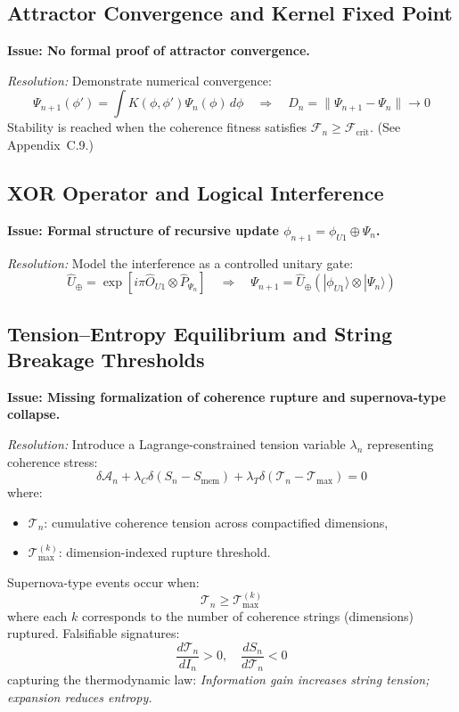\subsection*{Attractor Convergence and Kernel Fixed Point}

\textbf{Issue: No formal proof of attractor convergence.}

\textit{Resolution:}  
Demonstrate numerical convergence:
\[
\Psi_{n+1}(\phi') = \int K(\phi, \phi') \Psi_n(\phi) \, d\phi
\quad \Rightarrow \quad
D_n = \|\Psi_{n+1} - \Psi_n\| \to 0
\]
Stability is reached when the coherence fitness satisfies \( \mathcal{F}_n \geq \mathcal{F}_{\text{crit}} \). (See Appendix~C.9.)

\subsection*{XOR Operator and Logical Interference}

\textbf{Issue: Formal structure of recursive update \( \phi_{n+1} = \phi_{U1} \oplus \Psi_n \).}

\textit{Resolution:}  
Model the interference as a controlled unitary gate:
\[
\hat{U}_\oplus = \exp[i\pi \hat{O}_{U1} \otimes \hat{P}_{\Psi_n}]
\quad \Rightarrow \quad
\Psi_{n+1} = \hat{U}_\oplus \left( |\phi_{U1}\rangle \otimes |\Psi_n\rangle \right)
\]

\subsection*{Tension–Entropy Equilibrium and String Breakage Thresholds}

\textbf{Issue: Missing formalization of coherence rupture and supernova-type collapse.}

\textit{Resolution:}  
Introduce a Lagrange-constrained tension variable \( \lambda_n \) representing coherence stress:
\[
\delta \mathcal{A}_n + \lambda_C \delta(S_n - S_{\text{mem}}) + \lambda_T \delta(\mathcal{T}_n - \mathcal{T}_{\text{max}}) = 0
\]
where:
\begin{itemize}
  \item \( \mathcal{T}_n \): cumulative coherence tension across compactified dimensions,
  \item \( \mathcal{T}_{\text{max}}^{(k)} \): dimension-indexed rupture threshold.
\end{itemize}

Supernova-type events occur when:
\[
\mathcal{T}_n \geq \mathcal{T}_{\text{max}}^{(k)}
\]
where each \( k \) corresponds to the number of coherence strings (dimensions) ruptured. Falsifiable signatures:
\[
\frac{d\mathcal{T}_n}{dI_n} > 0, \quad \frac{dS_n}{d\mathcal{T}_n} < 0
\]
capturing the thermodynamic law: \textit{Information gain increases string tension; expansion reduces entropy.}

